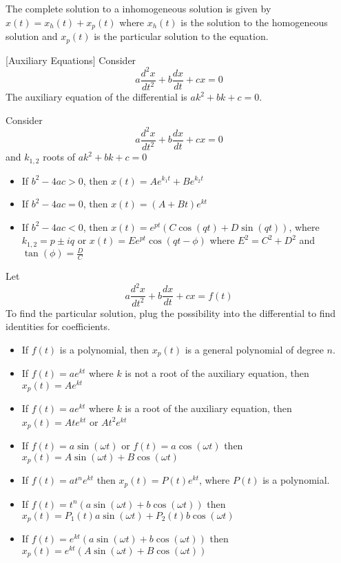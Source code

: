 \documentclass[a4paper]{article}
\begin{document}
\begin{defn}{}{} The complete solution to a inhomogeneous solution is given by $x(t)=x_h(t)+x_p(t)$ where $x_h(t)$ is the solution to the homogeneous solution and $x_p(t)$ is the particular solution to the equation. 
\end{defn}

\begin{defn}{}{}[Auxiliary Equations] Consider $$a\frac{d^2x}{dt^2}+b\frac{dx}{dt}+cx=0$$ The auxiliary equation of the differential is $ak^2+bk+c=0$. 
\end{defn}

\begin{thm}{}{} Consider $$a\frac{d^2x}{dt^2}+b\frac{dx}{dt}+cx=0$$ and $k_{1,2}$ roots of $ak^2+bk+c=0$
\begin{itemize}
\item If $b^2-4ac>0$, then $x(t)=Ae^{k_1t}+Be^{k_2t}$
\item If $b^2-4ac=0$, then $x(t)=(A+Bt)e^{kt}$
\item If $b^2-4ac<0$, then $x(t)=e^{pt}(C\cos(qt)+D\sin(qt))$, where $k_{1,2}=p\pm iq$ or $x(t)=Ee^{pt}\cos(qt-\phi)$ where $E^2=C^2+D^2$ and $\tan(\phi)=\frac{D}{C}$
\end{itemize}
\end{thm}

\begin{thm}{}{} Let $$a\frac{d^2x}{dt^2}+b\frac{dx}{dt}+cx=f(t)$$ To find the particular solution, plug the possibility into the differential to find identities for coefficients. 
\begin{itemize}
\item If $f(t)$ is a polynomial, then $x_p(t)$ is a general polynomial of degree $n$. 
\item If $f(t)=ae^{kt}$ where $k$ is not a root of the auxiliary equation, then $x_p(t)=Ae^{kt}$
\item If $f(t)=ae^{kt}$ where $k$ is a root of the auxiliary equation, then $x_p(t)=Ate^{kt}$ or $At^2e^{kt}$
\item If $f(t)=a\sin(\omega t)$ or $f(t)=a\cos(\omega t)$ then $x_p(t)=A\sin(\omega t)+B\cos(\omega t)$
\item If $f(t)=at^ne^{kt}$ then $x_p(t)=P(t)e^{kt}$, where $P(t)$ is a polynomial. 
\item If $f(t)=t^n(a\sin(\omega t)+b\cos(\omega t))$ then $x_p(t)=P_1(t)a\sin(\omega t)+P_2(t)b\cos(\omega t)$
\item If $f(t)=e^{kt}(a\sin(\omega t)+b\cos(\omega t))$ then $x_p(t)=e^{kt}(A\sin(\omega t)+B\cos(\omega t))$
\end{itemize}
\end{thm}
\end{document}
